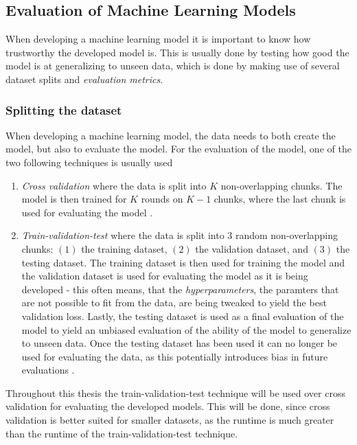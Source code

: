 \documentclass[./main.tex]{subfiles}
\begin{document}
\subsection{Evaluation of Machine Learning Models}\label{subsec:evaluation}
When developing a machine learning model it is important to know how trustworthy the developed model is. This is usually done by testing how good the model is at generalizing to unseen data, which is done by making use of several dataset splits and \textit{evaluation metrics}.

\subsubsection{Splitting the dataset}
When developing a machine learning model, the data needs to both create the model, but also to evaluate the model. For the evaluation of the model, one of the two following techniques is usually used

\begin{enumerate}
    \item \textit{Cross validation} where the data is split into $K$ non-overlapping chunks. The model is then trained for $K$ rounds on $K - 1$ chunks, where the last chunk is used for evaluating the model \cite{MAD_book}.
    \item \textit{Train-validation-test} where the data is split into $3$ random non-overlapping chunks: $(1)$ the training dataset, $(2)$ the validation dataset, and $(3)$ the testing dataset. The training dataset is then used for training the model and the validation dataset is used for evaluating the model as it is being developed - this often means, that the \textit{hyperparameters}, the paramters that are not possible to fit from the data, are being tweaked to yield the best validation loss. Lastly, the testing dataset is used as a final evaluation of the model to yield an unbiased evaluation of the ability of the model to generalize to unseen data. Once the testing dataset has been used it can no longer be used for evaluating the data, as this potentially introduces bias in future evaluations \cite{MAD_L3}.
\end{enumerate}
Throughout this thesis the train-validation-test technique will be used over cross validation for evaluating the developed models. This will be done, since cross validation is better suited for smaller datasets, as the runtime is much greater than the runtime of the train-validation-test technique.
\end{document}
